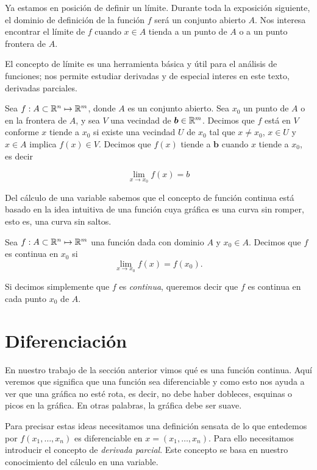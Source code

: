 Ya estamos en posición de definir un límite. Durante toda la exposición siguiente, el dominio de definición de la función $f$ será un conjunto abierto $A$.
Nos interesa encontrar el límite de $f$ cuando $x \in A$ tienda a un punto de $A$ o a un punto frontera de $A$.

El concepto de límite es una herramienta básica y útil para el análisis de funciones; nos permite estudiar derivadas y de especial interes en este texto,
derivadas parciales.

\begin{definition}[Límite]
    Sea $f:A \subset \mathbb{R}^{n} \mapsto \mathbb{R}^{m}$, donde $A$ es un conjunto abierto. Sea $x_{0}$ un punto de $A$ o en la frontera de $A$, y sea
    $V$ una vecindad de $\bm{b} \in \mathbb{R}^{m}$. Decimos que $f$ está en $V$ conforme $x$ tiende a $x_{0}$ si existe una vecindad $U$ de 
    $x_{0}$ tal que $x \neq x_{0}$, $x \in U$ y $x \in A$ implica $f(x) \in V$. Decimos que $f(x)$ tiende a $\bm{b}$ cuando
    $x$ tiende a $x_{0}$, es decir

    $$ \lim_{x \rightarrow x_{0}} f(x) = b $$
\end{definition}

Del cálculo de una variable sabemos que el concepto de función continua está basado en la idea intuitiva de una función cuya gráfica es una
curva sin romper, esto es, una curva sin saltos.

\begin{definition}
    Sea $f:A \subset \mathbb{R}^{n} \mapsto \mathbb{R}^{m}$ una función dada con dominio $A$ y $x_{0} \in A$. Decimos que $f$ es continua
    en $x_{0}$ si
    $$ \lim_{x \rightarrow x_{0}} f(x) = f(x_{0})\text{.}$$
\end{definition}

Si decimos simplemente que $f$ es \emph{continua}, queremos decir que $f$ es continua
en cada punto $x_{0}$ de $A$.

\section{Diferenciación}

En nuestro trabajo de la sección anterior vimos qué es una función continua. Aquí veremos que significa que una función sea diferenciable y como
esto nos ayuda a ver que una gráfica no esté rota, es decir, no debe haber dobleces, esquinas o picos en la gráfica. En otras palabras, la gráfica 
debe ser suave.

Para precisar estas ideas necesitamos una definición sensata de lo que entedemos por $f(x_{1}, \ldots, x_{n})$ es diferenciable en $x=(x_{1}, \ldots, x_{n})$.
Para ello necesitamos introducir el concepto de \emph{derivada parcial}. Este concepto se
basa en nuestro conocimiento del cálculo en una variable.

